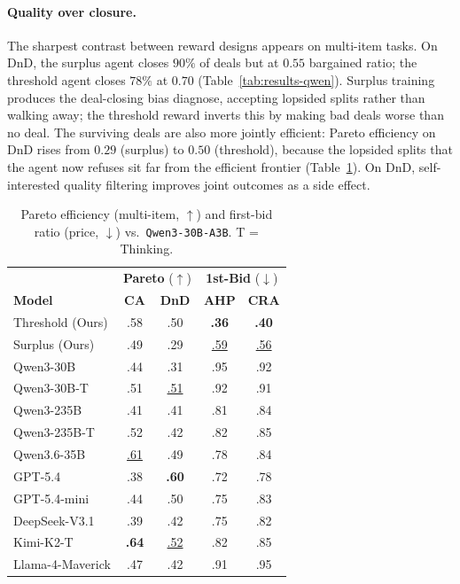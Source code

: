 \documentclass[11pt]{article}
\newcommand{\model}[1]{\texttt{#1}}
\newcommand{\lightrule}{\arrayrulecolor{black!20}\midrule\arrayrulecolor{black}}
\begin{document}
\paragraph{Quality over closure.}
The sharpest contrast between reward designs appears on multi-item tasks. On DnD, the surplus agent closes $90\%$ of deals but at $0.55$ bargained ratio; the threshold agent closes $78\%$ at $0.70$ (Table~\ref{tab:results-qwen}). Surplus training produces the deal-closing bias \citet{bergemann2026bilateral} diagnose, accepting lopsided splits rather than walking away; the threshold reward inverts this by making bad deals worse than no deal. The surviving deals are also more jointly efficient: Pareto efficiency on DnD rises from $0.29$ (surplus) to $0.50$ (threshold), because the lopsided splits that the agent now refuses sit far from the efficient frontier (Table~\ref{tab:fbr_pareto_vs_qwen}). On DnD, self-interested quality filtering improves joint outcomes as a side effect.

\begin{table}[!t]
\centering
\scriptsize
\setlength{\tabcolsep}{3pt}
\renewcommand{\arraystretch}{1.15}
\begin{tabular}{l cc cc}
\toprule
\rowcolor{tableheader}
& \multicolumn{2}{c}{\textbf{Pareto} ($\uparrow$)} & \multicolumn{2}{c}{\textbf{1st-Bid} ($\downarrow$)} \\
\rowcolor{tableheader}
\textbf{Model} & \textbf{CA} & \textbf{DnD} & \textbf{AHP} & \textbf{CRA} \\
\midrule
\rowcolor{tablerow}
Threshold (Ours) & .58          & .50          & \textbf{.36} & \textbf{.40} \\
Surplus (Ours)   & .49          & .29          & \underline{.59} & \underline{.56} \\
\lightrule
\rowcolor{tablerow}
Qwen3-30B        & .44          & .31          & .95          & .92 \\
Qwen3-30B-T      & .51          & \underline{.51} & .92       & .91 \\
\rowcolor{tablerow}
Qwen3-235B       & .41          & .41          & .81          & .84 \\
Qwen3-235B-T     & .52          & .42          & .82          & .85 \\
\rowcolor{tablerow}
Qwen3.6-35B      & \underline{.61} & .49          & .78          & .84 \\
GPT-5.4          & .38          & \textbf{.60} & .72          & .78 \\
\rowcolor{tablerow}
GPT-5.4-mini     & .44          & .50          & .75          & .83 \\
DeepSeek-V3.1    & .39          & .42          & .75          & .82 \\
\rowcolor{tablerow}
Kimi-K2-T        & \textbf{.64} & \underline{.52} & .82       & .85 \\
Llama-4-Maverick      & .47          & .42          & .91          & .95 \\
\bottomrule
\end{tabular}
\caption{Pareto efficiency (multi-item, $\uparrow$) and first-bid ratio (price, $\downarrow$) vs.\ \model{Qwen3-30B-A3B}. T = Thinking.}
\label{tab:fbr_pareto_vs_qwen}
\end{table}
\end{document}
